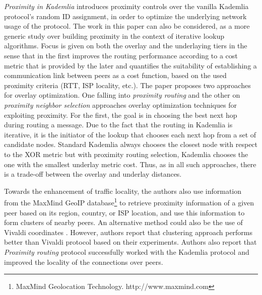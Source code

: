\emph{Proximity in Kademlia} \cite{KLKP2008} introduces proximity
controls over the vanilla Kademlia protocol's random ID assignment, in order to
optimize the underlying network usage of the protocol. The work in this paper
can also be considered, as a more generic study over building proximity in the
context of iterative lookup algorithms. Focus is given on both the overlay and
the underlaying tiers in the sense that in the first improves the routing
performance according to a cost metric that is provided by the later and
quantifies the suitability of establishing a communication link between peers as
a cost function, based on the used proximity criteria (RTT, ISP locality, etc.).
The paper proposes two approaches for overlay optimization. One falling into
{\em proximity routing} and the other on {\em proximity neighbor selection}
approaches overlay optimization techniques for exploiting proximity. For the
first, the goal is in choosing the best next hop during routing a message. Due
to the fact that the routing in Kademlia is iterative, it is the initiator of
the lookup that chooses each next hop from a set of candidate nodes. Standard
Kademlia always chooses the closest node with respect to the XOR metric but with
proximity routing selection, Kademlia chooses the one with the smallest underlay
metric cost. Thus, as in all such approaches, there is a trade-off between the
overlay and underlay distances.

Towards the enhancement of traffic locality, the authors also use information
from the MaxMind GeoIP database\footnote{MaxMind Geolocation Technology.
http://www.maxmind.com} to retrieve proximity information of a given peer based
on its region, country, or ISP location, and use this information to form
clusters of nearby peers. An alternative method could also be the use of Vivaldi
coordinates \cite{cox_vivaldi_2004}. However, authors report that clustering
approach performs better than Vivaldi protocol based on their experiments.
Authors also report that {\em Proximity routing} protocol successfully worked
with the Kademlia protocol and improved the locality of the connections over
peers.


